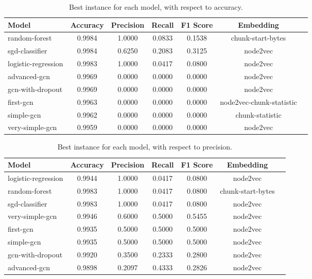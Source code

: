 
    \begin{table}
        \centering
        \caption{Best instance for each model, with respect to accuracy.}
        \begin{tabular}{|l|c|c|c|c|c|c|} \hline 
          \textbf{Model}  & \textbf{Accuracy} & \textbf{Precision} & \textbf{Recall} & \textbf{F1 Score} & \textbf{Embedding}  \\ \hline 
            random-forest & 0.9984 & 1.0000 & 0.0833 & 0.1538 & chunk-start-bytes \\ \hline 
            sgd-classifier & 0.9984 & 0.6250 & 0.2083 & 0.3125 & node2vec \\ \hline 
            logistic-regression & 0.9983 & 1.0000 & 0.0417 & 0.0800 & node2vec \\ \hline 
            advanced-gcn & 0.9969 & 0.0000 & 0.0000 & 0.0000 & node2vec \\ \hline 
            gcn-with-dropout & 0.9969 & 0.0000 & 0.0000 & 0.0000 & node2vec \\ \hline 
            first-gcn & 0.9963 & 0.0000 & 0.0000 & 0.0000 & node2vec-chunk-statistic \\ \hline 
            simple-gcn & 0.9962 & 0.0000 & 0.0000 & 0.0000 & chunk-statistic \\ \hline 
            very-simple-gcn & 0.9959 & 0.0000 & 0.0000 & 0.0000 & node2vec \\ \hline 
        \end{tabular}
    \end{table}


    \begin{table}
        \centering
        \caption{Best instance for each model, with respect to precision.}
        \begin{tabular}{|l|c|c|c|c|c|c|} \hline 
          \textbf{Model}  & \textbf{Accuracy} & \textbf{Precision} & \textbf{Recall} & \textbf{F1 Score} & \textbf{Embedding}  \\ \hline 
            logistic-regression & 0.9944 & 1.0000 & 0.0417 & 0.0800 & node2vec \\ \hline 
            random-forest & 0.9983 & 1.0000 & 0.0417 & 0.0800 & chunk-start-bytes \\ \hline 
            sgd-classifier & 0.9983 & 1.0000 & 0.0417 & 0.0800 & node2vec \\ \hline 
            very-simple-gcn & 0.9946 & 0.6000 & 0.5000 & 0.5455 & node2vec \\ \hline 
            first-gcn & 0.9935 & 0.5000 & 0.5000 & 0.5000 & node2vec \\ \hline 
            simple-gcn & 0.9935 & 0.5000 & 0.5000 & 0.5000 & node2vec \\ \hline 
            gcn-with-dropout & 0.9920 & 0.3500 & 0.2333 & 0.2800 & node2vec \\ \hline 
            advanced-gcn & 0.9898 & 0.2097 & 0.4333 & 0.2826 & node2vec \\ \hline 
        \end{tabular}
    \end{table}


